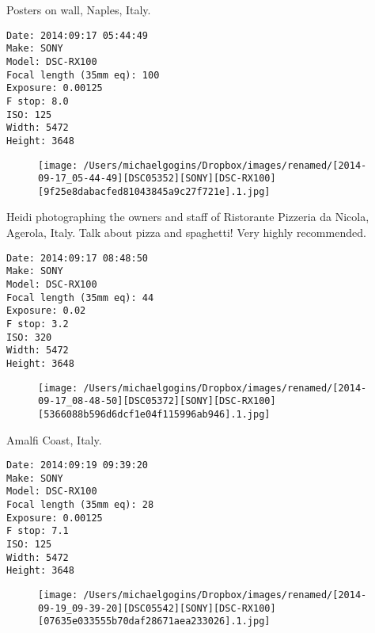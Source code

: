 \documentclass[11pt,letter,DIV=14,paper=landscape]{scrbook}
\begin{document}
\clearpage
\noindent Posters on wall, Naples, Italy.
\noindent
\begin{lstlisting}
Date: 2014:09:17 05:44:49
Make: SONY
Model: DSC-RX100
Focal length (35mm eq): 100
Exposure: 0.00125
F stop: 8.0
ISO: 125
Width: 5472
Height: 3648
\end{lstlisting}
\clearpage

\begin{figure}
\texttt{[image: /Users/michaelgogins/Dropbox/images/renamed/[2014-09-17\_05-44-49][DSC05352][SONY][DSC-RX100][9f25e8dabacfed81043845a9c27f721e].1.jpg]}
\end{figure}
    
\clearpage
\noindent Heidi photographing the owners and staff of Ristorante Pizzeria da Nicola, Agerola, Italy. Talk about pizza and spaghetti! Very highly recommended.
\noindent
\begin{lstlisting}
Date: 2014:09:17 08:48:50
Make: SONY
Model: DSC-RX100
Focal length (35mm eq): 44
Exposure: 0.02
F stop: 3.2
ISO: 320
Width: 5472
Height: 3648
\end{lstlisting}
\clearpage

\begin{figure}
\texttt{[image: /Users/michaelgogins/Dropbox/images/renamed/[2014-09-17\_08-48-50][DSC05372][SONY][DSC-RX100][5366088b596d6dcf1e04f115996ab946].1.jpg]}
\end{figure}
    
\clearpage
\noindent Amalfi Coast, Italy.
\noindent
\begin{lstlisting}
Date: 2014:09:19 09:39:20
Make: SONY
Model: DSC-RX100
Focal length (35mm eq): 28
Exposure: 0.00125
F stop: 7.1
ISO: 125
Width: 5472
Height: 3648
\end{lstlisting}
\clearpage

\begin{figure}
\texttt{[image: /Users/michaelgogins/Dropbox/images/renamed/[2014-09-19\_09-39-20][DSC05542][SONY][DSC-RX100][07635e033555b70daf28671aea233026].1.jpg]}
\end{figure}
    
\end{document}
